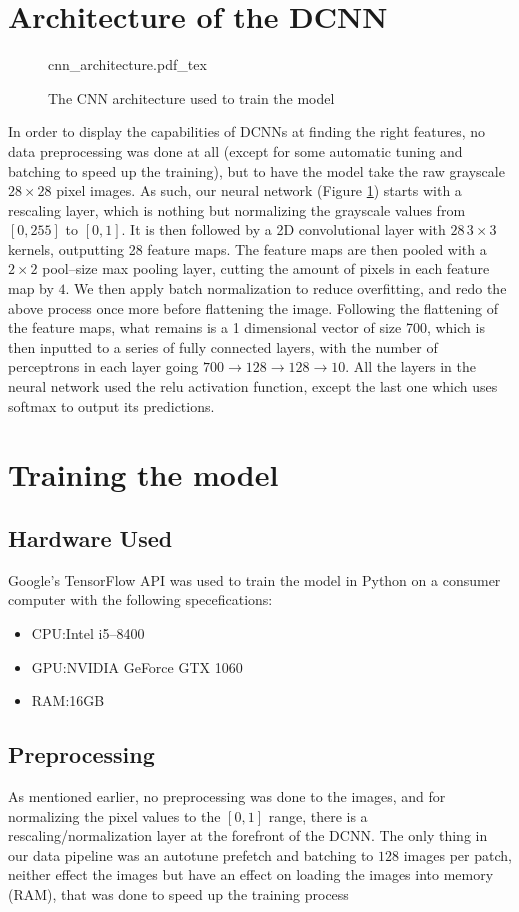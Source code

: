 \documentclass[conference]{IEEEtran}
\begin{document}
\section{Architecture of the DCNN}\label{sec:train}
\begin{figure}[!htp]
    \centering
    \def\svgwidth{\columnwidth}
    \scriptsize
    {cnn_architecture.pdf_tex}
    \caption{The CNN architecture used to train the model}\label{fig:cnn_architecture}
\end{figure}
In order to display the capabilities of DCNNs at finding the right features, no data preprocessing was done at all (except for some automatic tuning and batching to speed up the training), but to have the model take the raw grayscale $28 \times 28$ pixel images.\@
As such, our neural network (Figure \ref{fig:cnn_architecture}) starts with a rescaling layer, which is nothing but normalizing the grayscale values from $[0, 255]$ to $[0, 1]$. It is then followed by a 2D convolutional layer with $28 \, 3 \times 3$ kernels, outputting 28 feature maps. The feature maps are then pooled with a $2 \times 2$ pool--size max pooling layer, cutting the amount of pixels in each feature map by $4$. We then apply batch normalization\cite{batchnorm} to reduce overfitting, and redo the above process once more before flattening the image.\@
Following the flattening of the feature maps, what remains is a 1 dimensional vector of size 700, which is then inputted to a series of fully connected layers, with the number of perceptrons in each layer going $700 \to 128 \to 128 \to 10$. All the layers in the neural network used the relu activation function, except the last one which uses softmax to output its predictions.
\section{Training the model}
\subsection{Hardware Used}
Google's TensorFlow API\cite{tensorflow2015-whitepaper} was used to train the model in Python on a consumer computer with the following specefications:
\begin{itemize}
    \item CPU:\@ Intel i5--8400
    \item GPU:\@ NVIDIA GeForce GTX 1060
    \item RAM:\@ 16GB
\end{itemize}
\subsection{Preprocessing}
As mentioned earlier, no preprocessing was done to the images, and for normalizing the pixel values to the $[0, 1]$ range, there is a rescaling/normalization layer at the forefront of the DCNN. The only thing in our data pipeline was an autotune prefetch and batching to $128$ images per patch, neither effect the images but have an effect on loading the images into memory (RAM), that was done to speed up the training process
\end{document}
